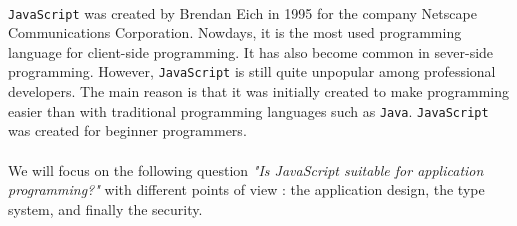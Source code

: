 \paragraph{}
\texttt{JavaScript} was created by Brendan Eich in 1995 for the company Netscape Communications Corporation. Nowdays, it is the most used programming language for client-side programming. It has also become common in sever-side programming. However, \texttt{JavaScript} is still quite unpopular among professional developers. The main reason is that it was initially created to make programming easier than with traditional programming languages such as \texttt{Java}. \texttt{JavaScript} was created for beginner programmers.
\paragraph{}
We will focus on the following question \emph{"Is JavaScript suitable for application programming?"} with different points of view : the application design, the type system, and finally the security. 
